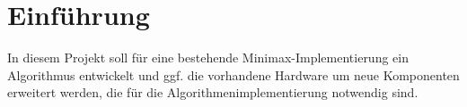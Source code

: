 \chapter{Einführung}
\label{chapter:Pflichtenheft-Einfuehrung}

In diesem Projekt soll für eine bestehende Minimax-Implementierung ein Algorithmus entwickelt und ggf. die vorhandene Hardware um neue Komponenten erweitert werden, die für die Algorithmenimplementierung notwendig sind.
